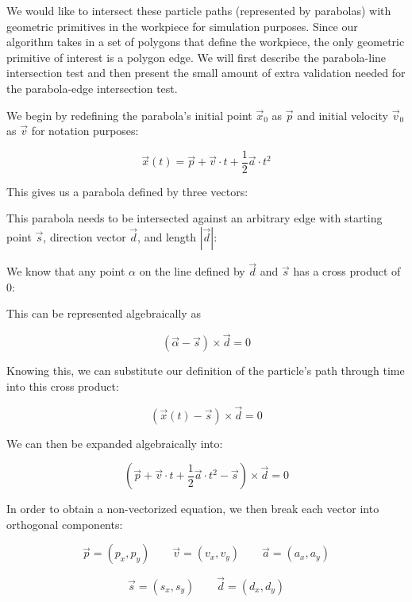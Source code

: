 We would like to intersect these particle paths (represented by parabolas) with geometric primitives in the workpiece for simulation purposes. Since our algorithm takes in a set of polygons that define the workpiece, the only geometric primitive of interest is a polygon edge. We will first describe the parabola-line intersection test and then present the small amount of extra validation needed for the parabola-edge intersection test.

We begin by redefining the parabola's initial point $\vec{x}_0$ as $\vec{p}$ and initial velocity $\vec{v}_0$ as $\vec{v}$ for notation purposes:

$$
\vec{x}(t) = \vec{p} + \vec{v} \cdot t + \frac{1}{2} \vec{a} \cdot t^2
$$

This gives us a parabola defined by three vectors:


This parabola needs to be intersected against an arbitrary edge with starting point $\vec{s}$, direction vector $\vec{d}$, and length $|\vec{d}|$:


We know that any point $\alpha$ on the line defined by $\vec{d}$ and $\vec{s}$ has a cross product of 0:


This can be represented algebraically as

$$
(\vec{\alpha} - \vec{s}) \times \vec{d} = 0
$$

Knowing this, we can substitute our definition of the particle's path through time into this cross product:

$$
(\vec{x}(t) - \vec{s}) \times \vec{d} = 0
$$

We can then be expanded algebraically into:

$$
(\vec{p} + \vec{v} \cdot t + \frac{1}{2} \vec{a} \cdot t^2 - \vec{s}) \times \vec{d} = 0
$$

In order to obtain a non-vectorized equation, we then break each vector into orthogonal components:

$$
\vec{p} = (p_x, p_y) \qquad \vec{v} = (v_x, v_y) \qquad \vec{a} = (a_x, a_y)
$$

$$
\vec{s} = (s_x, s_y) \qquad \vec{d} = (d_x, d_y)
$$

